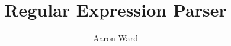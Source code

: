 \documentclass[12pt,ITBthesis]{report}
\begin{document}
\makeatletter
\renewcommand\listoffigures{%
        \@starttoc{lot}%
}
\makeatother

\makeatletter
\renewcommand\listoftables{%
        \@starttoc{lot}%
}
\makeatother

\makeatletter
\renewcommand\appendix{%
 \par
 \setcounter{chapter}{0}%
 \setcounter{section}{0}%
 \setcounter{subsection}{0}%
 \gdef\thesection{\@Alph\c@section}
 \gdef\@sect##1##2##3##4##5##6[##7]##8{%
  \refstepcounter{##1}%
  \protected@edef\@svsec{\@seccntformat{##1}\relax}%
  \begingroup
    \hspace{-\parindent}##6\appendixname~ {%
    \@hangfrom{\hskip ##3 \relax\@svsec}\par%
    \hspace{-\parindent}\interlinepenalty \@M ##8 \@@par}%
  \endgroup
  \csname ##1mark\endcsname{##7}%
  \addcontentsline{toc}{##1}{\protect\numberline{\csname the##1\endcsname}##7}%
  \@xsect{##5}%
 }%
}%
\makeatother

\setlength{\parskip}{1ex plus 0.5ex minus 0.2ex}


\title{Regular Expression Parser}

\author{Aaron Ward}



\address{Dublin, Ireland }






%

\setcounter{page}{1} \beforepreface



{ 
}

%



\afterpreface
\def\baselinestretch{1}
\end{document}
